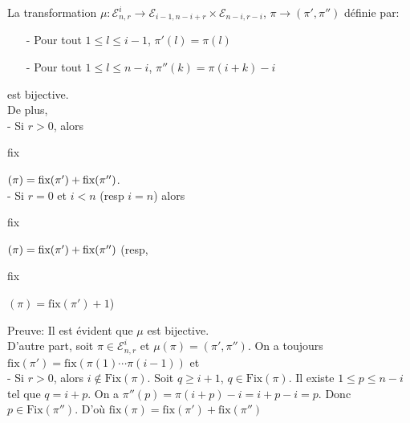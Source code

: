\begin{proposition}\label{p7}
	La transformation $\mu: \mathcal{E}_{n, r}^{i} \longrightarrow \mathcal{E}_{i-1, n-i+r}\times \mathcal{E}_{n-i, r-i}$, $\pi \longrightarrow (\pi', \pi'')$ définie par:
	\begin{itemize}
		\item[-] Pour tout $1 \leq l \leq i-1 $, $\pi'(l) = \pi(l)$
		\item[-] Pour tout $1 \leq l \leq n-i$, $\pi''(k) = \pi(i+k)-i$
	\end{itemize}
	est bijective.\vspace{5pt}\\
	De plus, \\
	- Si $r>0$, alors \begin{rm}fix\end{rm}$(\pi) = \begin{rm}fix\end{rm}(\pi') + \begin{rm}fix\end{rm}(\pi'')$.\\
	- Si $r=0$ et $i<n$ (resp $i=n$) alors \begin{rm}fix\end{rm}$(\pi) = \begin{rm}fix\end{rm}(\pi') + \begin{rm}fix\end{rm}(\pi'')$ (resp, \begin{rm}fix\end{rm}$(\pi) = \text{fix}(\pi') + 1$)
\end{proposition}
Preuve: Il est évident que $\mu$ est bijective.\\
D'autre part, soit $\pi \in \mathcal{E}_{n, r}^{i}$ et $\mu(\pi)=(\pi', \pi'')$. On a toujours $\text{fix}(\pi') = \text{fix}(\pi(1)\cdots \pi(i-1))$ et\\
- Si $r>0$, alors $i \notin \text{Fix}(\pi)$. Soit $q\geq i+1$, $q\in \text{Fix}(\pi)$. Il existe $1 \leq p \leq n-i$ tel que $q=i+p$. On a $\pi''(p) = \pi(i+p) - i = i+p - i = p$. Donc $p \in \text{Fix}(\pi'')$. D'où $\text{fix}(\pi) =  \text{fix}(\pi') + \text{fix}(\pi'')$\\
